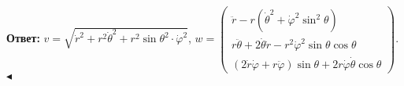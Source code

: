 \documentclass{weekly}
\begin{document}
\textbf{Ответ:}\quad
$v = \sqrt{\dot r^2 + r^2 \dot\theta^2 +
    r^2 \sin\theta^2 \cdot \dot\varphi^2}$,\qquad
$w = \begin{pmatrix}
    \ddot r - r \left( \dot\theta^2 +
            \dot\varphi^2 \sin^2\theta \right) \\
    r \ddot\theta + 2\dot\theta \dot r -
            r^2 \dot\varphi^2 \sin\theta \cos\theta \\
    (2 \dot r \dot\varphi + r \ddot\varphi) \sin\theta +
            2r \dot\varphi \dot\theta \cos\theta
\end{pmatrix}$.
\hfill $\blacktriangleleft$
\end{document}
